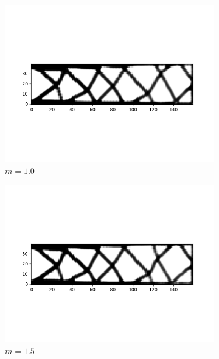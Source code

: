 \begin{figure}
\begin{subfigure}[t]{0.45\textwidth}
          \centering
          \includegraphics[width=1\textwidth]{./images/robust_exact/exact_svd_mean_10std_csimp.png}
          \caption{$m = 1.0$}
        \end{subfigure}
        \begin{subfigure}[t]{0.45\textwidth}
          \centering
          \includegraphics[width=1\textwidth]{./images/robust_exact/exact_svd_mean_15std_csimp.png}
          \caption{$m = 1.5$}
        \end{subfigure}
        \begin{subfigure}[t]{0.45\textwidth}
          \centering

\end{subfigure}
\end{figure}
